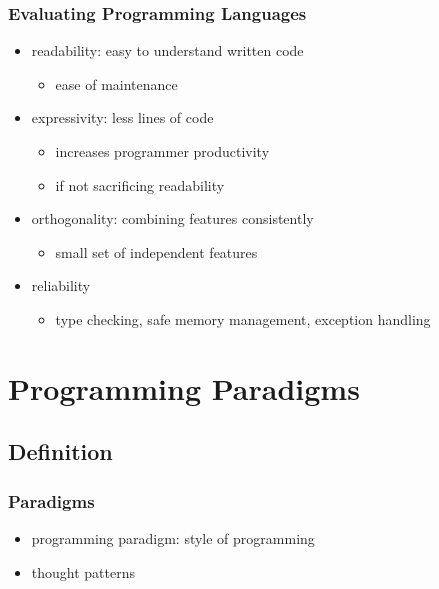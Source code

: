 \documentclass[dvipsnames]{beamer}
\theoremstyle{plain}
\begin{document}
\begin{frame}
  \frametitle{Evaluating Programming Languages}

  \begin{itemize}
    \item \alert{readability}: easy to understand written code
    \begin{itemize}
      \item ease of maintenance
    \end{itemize}

    \pause
    \medskip
    \item \alert{expressivity}: less lines of code
    \begin{itemize}
      \item increases programmer productivity
      \item if not sacrificing readability
    \end{itemize}

    \pause
    \medskip
    \item \alert{orthogonality}: combining features consistently
    \begin{itemize}
      \item small set of independent features
    \end{itemize}

    \pause
    \medskip
    \item \alert{reliability}
    \begin{itemize}
      \item type checking, safe memory management, exception handling
    \end{itemize}
  \end{itemize}
\end{frame}

\section{Programming Paradigms}

\subsection{Definition}

\begin{frame}
  \frametitle{Paradigms}

  \begin{itemize}
    \item programming paradigm: style of programming
    \item thought patterns
  \end{itemize}
\end{frame}
\end{document}
